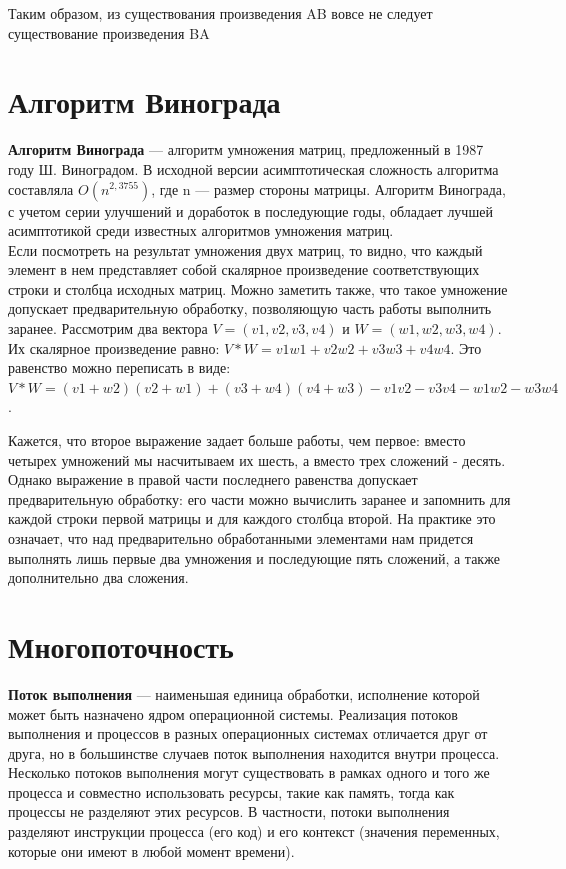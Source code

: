 \documentclass[a4paper,12pt]{report}
\begin{document}
Таким образом, из существования произведения AB вовсе не следует существование произведения BA

\section{Алгоритм Винограда}
\hspace{0.6cm} \textbf {Алгоритм Винограда} — алгоритм умножения матриц, предложенный в 1987 году Ш. Виноградом. В исходной версии асимптотическая сложность алгоритма составляла $O(n^{2,3755})$, где n — размер стороны матрицы. Алгоритм Винограда, с учетом серии улучшений и доработок в последующие годы, обладает лучшей асимптотикой среди известных алгоритмов умножения матриц.\\
Если посмотреть на результат умножения двух матриц, то видно, что каждый элемент в нем представляет собой скалярное произведение соответствующих строки и столбца исходных матриц. Можно заметить также, что такое умножение допускает предварительную обработку, позволяющую часть работы выполнить заранее. 
Рассмотрим два вектора
$V = (v1, v2, v3, v4)$ и
$W = (w1, w2, w3, w4)$.
Их скалярное произведение равно: 
$V * W = v1w1 + v2w2 + v3w3 + v4w4$.
Это равенство можно переписать в виде: 
$V * W = (v1 + w2)(v2 + w1) + (v3 + w4)(v4 + w3) - v1v2 - v3v4 - w1w2 - w3w4$.

Кажется, что второе выражение задает больше работы, чем первое: вместо четырех умножений мы насчитываем их шесть, а вместо трех сложений - десять. Однако выражение в правой части последнего равенства допускает предварительную обработку: его части можно вычислить заранее и запомнить для каждой строки первой матрицы и для каждого столбца второй. На практике это означает, что над предварительно обработанными элементами нам придется выполнять лишь первые два умножения и последующие пять сложений, а также дополнительно два сложения.

\section{Многопоточность}
\hspace{0.6cm} \textbf {Поток выполнения} — наименьшая единица обработки, исполнение которой может быть назначено ядром операционной системы. Реализация потоков выполнения и процессов в разных операционных системах отличается друг от друга, но в большинстве случаев поток выполнения находится внутри процесса. Несколько потоков выполнения могут существовать в рамках одного и того же процесса и совместно использовать ресурсы, такие как память, тогда как процессы не разделяют этих ресурсов. В частности, потоки выполнения разделяют инструкции процесса (его код) и его контекст (значения переменных, которые они имеют в любой момент времени).
\end{document}
